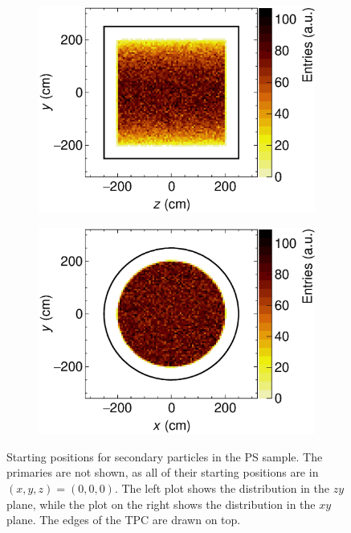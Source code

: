 \begin{figure}[!ht]
     \centering
     \begin{subfigure}[b]{0.48\textwidth}
         \centering
         \includegraphics[width=\textwidth]{figures/ch5-KF_NDGAr/ToySample/testTPCMirrorYZ_view.eps}
         \caption{}
         \label{fig:YZViewGAr}
     \end{subfigure}
     \begin{subfigure}[b]{0.48\textwidth}
         \centering
         \includegraphics[width=\textwidth]{figures/ch5-KF_NDGAr/ToySample/testTPCMirrorXY_view.eps}
         \caption{}
         \label{fig:XYViewGAr}
     \end{subfigure}
        \caption{Starting positions for secondary particles in the PS sample. The primaries are not shown, as all of their starting positions are in $(x,y,z)=(0,0,0)$. The left plot shows the distribution in the $zy$ plane, while the plot on the right shows the distribution in the $xy$ plane. The edges of the TPC are drawn on top. } \label{fig:ViewGAr}
\end{figure}

